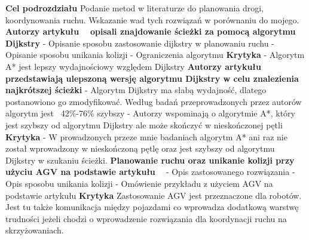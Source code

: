 \textbf{Cel podrozdziału}
\newline
Podanie metod w literaturze do planowania drogi, koordynowania ruchu. Wskazanie wad tych rozwiązań w porównaniu do mojego.
\newline
\newline
\textbf{Autorzy artykułu ~\cite{shaikh2013agv} opisali znajdowanie ścieżki za pomocą algorytmu Dijkstry}
\newline
- Opisanie sposobu zastosowanie dijkstry w planowaniu ruchu
\newline
- Opisanie sposobu unikania kolizji
\newline
- Ograniczenia algorytmu
\newline
\newline
\textbf{Krytyka}
\newline
- Algorytm A* jest lepszy wydajnościowy względem Dijkstry
\newline
\newline
\textbf{Autorzy artykułu ~\cite{huang2013improved} przedstawiają ulepszoną wersję algorytmu Dijkstry w celu znalezienia najkrótszej ścieżki}
\newline
- Algorytm Dijkstry ma słabą wydajność, dlatego postanowiono go zmodyfikować. Według badań przeprowadzonych przez autorów algorytm jest ~42\%-76\% szybszy
\newline
- Autorzy wspominają o algorytmie A*, który jest szybszy od algorytmu Dijkstry ale może skończyć w nieskończonej pętli
\newline
\newline
\textbf{Krytyka}
\newline
- W prowadzonych przeze mnie badaniach algorytm A* ani raz nie został wprowadzony w nieskończoną pętlę oraz jest szybszy od algorytmu Dijkstry w szukaniu ścieżki.
\newline
\newline
\textbf{Planowanie ruchu oraz unikanie kolizji przy użyciu AGV na podstawie artykułu ~\cite{ando2003autonomous}}
\newline
- Opis zastosowanego rozwiązania
\newline
- Opis sposobu unikania kolizji
\newline
- Omówienie przykładu z użyciem AGV na podstawie artykułu
\newline
\newline
\textbf{Krytyka}
\newline
Zastosowanie AGV jest przeznaczone dla robotów. Jest tu także komunikacja między pojazdami co wprowadza dodatkową warstwę trudności jeżeli chodzi o wprowadzenie rozwiązania dla koordynacji ruchu na skrzyżowaniach.
